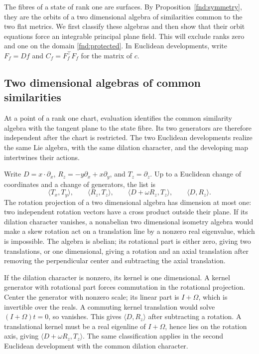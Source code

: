\documentclass[11pt,a4paper]{article}
\numberwithin{equation}{section}
\theoremstyle{plain}
\theoremstyle{definition}
\theoremstyle{remark}
\begin{document}
The fibres of a state of rank one are surfaces. By
Proposition~\ref{fnd:symmetry}, they are the orbits of a two dimensional
algebra of similarities common to the two flat metrics. We first
classify these algebras and then show that their orbit equations force
an integrable principal plane field. This will exclude ranks zero and
one on the domain \eqref{fnd:protected}.
In Euclidean developments, write $F_f=Df$ and
$C_f=F_f^{\top}F_f$ for the matrix of $c$.

\subsection{Two dimensional algebras of common similarities}

At a point of a rank one chart, evaluation identifies the common
similarity algebra with the tangent plane to the state fibre. Its two
generators are therefore independent after the chart is restricted.
The two Euclidean developments realize the same Lie algebra, with the
same dilation character, and the developing map intertwines their
actions.

Write $D=x\cdot\partial_x$, $R_z=-y\partial_x+x\partial_y$, and $T_z=\partial_z$. Up to a Euclidean change of coordinates and a change of generators, the list is
\begin{equation}\label{fnd:fourtypes}
\langle T_x,T_y\rangle,\qquad \langle R_z,T_z\rangle,\qquad
\langle D+\omega R_z,T_z\rangle,\qquad \langle D,R_z\rangle.
\end{equation}
The rotation projection of a two dimensional algebra has dimension at most one: two independent rotation vectors have a cross product outside their plane. If its dilation character vanishes, a nonabelian two dimensional isometry algebra would make a skew rotation act on a translation line by a nonzero real eigenvalue, which is impossible. The algebra is abelian; its rotational part is either zero, giving two translations, or one dimensional, giving a rotation and an axial translation after removing the perpendicular center and subtracting the axial translation.

If the dilation character is nonzero, its kernel is one dimensional. A kernel generator with rotational part forces commutation in the rotational projection. Center the generator with nonzero scale; its linear part is $I+\Omega$, which is invertible over the reals. A commuting kernel translation would solve $(I+\Omega)t=0$, so vanishes. This gives $\langle D,R_z\rangle$ after subtracting a rotation. A translational kernel must be a real eigenline of $I+\Omega$, hence lies on the rotation axis, giving $\langle D+\omega R_z,T_z\rangle$. The same classification applies in the second Euclidean development with the common dilation character.
\end{document}
